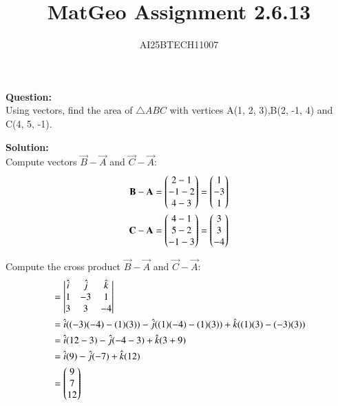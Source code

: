 \documentclass[journal]{IEEEtran}
\begin{document}

\vspace{3cm}

\title{MatGeo Assignment 2.6.13}
\author{AI25BTECH11007}
 \maketitle
{\let\newpage\relax\maketitle}

\renewcommand{\thefigure}{\theenumi}
\renewcommand{\thetable}{\theenumi}
\setlength{\intextsep}{10pt} %


\renewcommand{\thetable}{\theenumi}
\textbf{Question:}\\
Using vectors, find the area of $\triangle ABC$ with vertices A(1, 2, 3),B(2, -1, 4) and C(4, 5, -1).

\textbf{Solution:}\\
 Compute vectors $\vec{B}-\vec{A}$ and $\vec{C}-\vec{A}$:
\begin{align}
 \mathbf{B} - \mathbf{A} = \begin{pmatrix}2-1 \\ -1-2 \\ 4-3\end{pmatrix} = \begin{pmatrix}1 \\ -3 \\ 1\end{pmatrix} \label{eq:1} \\
 \mathbf{C} - \mathbf{A} = \begin{pmatrix}4-1 \\ 5-2 \\ -1-3\end{pmatrix} = \begin{pmatrix}3 \\ 3 \\ -4\end{pmatrix} \label{eq:2}
\end{align}

 Compute the cross product $\vec{B}-\vec{A}$ and $\vec{C}-\vec{A}$:
\begin{align}
[\vec{B}-\vec{A} \times \vec{C}-\vec{A}] &=
\begin{vmatrix}
\hat{i} & \hat{j} & \hat{k} \\
1 & -3 & 1 \\
3 & 3 & -4
\end{vmatrix} \notag \\
&= \hat{i}((-3)(-4) - (1)(3)) - \hat{j}((1)(-4) - (1)(3)) + \hat{k}((1)(3) - (-3)(3)) \notag \\
&= \hat{i}(12-3) - \hat{j}(-4-3) + \hat{k}(3+9) \notag \\
&= \hat{i}(9) - \hat{j}(-7) + \hat{k}(12) \notag \\
&= \myvec{9 \\ 7 \\ 12} \label{eq:3}
\end{align}
\end{document}
